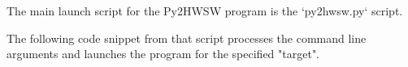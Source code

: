 %

The main launch script for the Py2HWSW program is the `py2hwsw.py` script.

The following code snippet from that script processes the command line arguments and launches the program for the specified "target".



